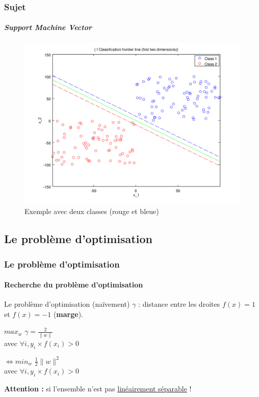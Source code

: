 \documentclass{beamer}
\begin{document}
\begin{frame}
\frametitle{Sujet}
\framesubtitle{\emph{Support Machine Vector}}

         \begin{figure}
         \centering
         \caption{Exemple avec deux classes (rouge et bleue)}
         \includegraphics[scale=0.4]{images/voronoi.png}
         \end{figure}

\end{frame}

\subsection{Le problème d'optimisation}

\begin{frame}
\frametitle{Le problème d'optimisation}
\framesubtitle{Recherche du problème d'optimisation}

\begin{block}{Le problème d'optimisation (naïvement)}
$\gamma$ : distance entre les droites $f(x) = 1$ et $f(x) = -1$ (\textbf{marge}).

\pause

      \begin{center}
        $max_{w}$ $\gamma = \frac{2}{\|w\|}$\\
        avec $\forall i, y_i \times f(x_i) > 0$\\

\pause

       \bigskip
        $\Leftrightarrow min_{w}$ $\frac{1}{2} \|w\|^2$\\
        avec $\forall i, y_i \times f(x_i) > 0$\\
      \end{center}

\end{block}

\textbf{Attention :} si l'ensemble n'est pas \underline{ linéairement séparable} !

\end{frame}
\end{document}
